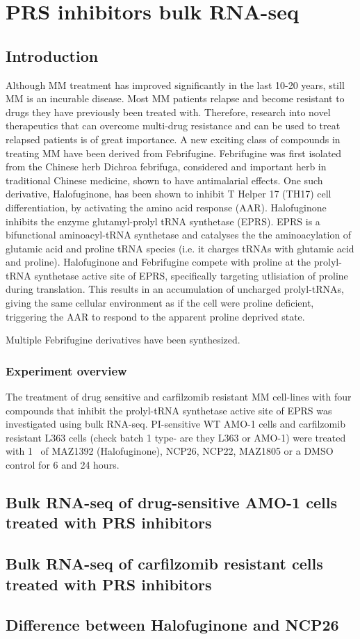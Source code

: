 \chapter{\label{ch:5-bulk}PRS inhibitors bulk RNA-seq}


\section{Introduction}
Although MM treatment has improved significantly in the last 10-20 years, still MM is an incurable disease.
Most MM patients relapse and become resistant to drugs they have previously been treated with.
Therefore, research into novel therapeutics that can overcome multi-drug resistance and can be used to treat relapsed patients is of great importance.
A new exciting class of compounds in treating MM have been derived from Febrifugine.
Febrifugine was first isolated from the Chinese herb Dichroa febrifuga, considered and important herb in traditional Chinese medicine, shown to have antimalarial effects.
One such derivative, Halofuginone, has been shown to inhibit T Helper 17 (TH17) cell differentiation, by activating the amino acid response (AAR)\cite{sundrud2009halofuginone}.
Halofuginone inhibits the enzyme glutamyl-prolyl tRNA synthetase (EPRS).
EPRS is a bifunctional aminoacyl-tRNA synthetase and catalyses the the aminoacylation of glutamic acid and proline tRNA species (i.e. it charges tRNAs with glutamic acid and proline).
Halofuginone and Febrifugine compete with proline at the prolyl-tRNA synthetase active site of EPRS, specifically targeting utlisiation of proline during translation\cite{keller2012halofuginone}.
This results in an accumulation of uncharged prolyl-tRNAs, giving the same cellular environment as if the cell were proline deficient, triggering the AAR to respond to the apparent proline deprived state.

Multiple Febrifugine derivatives have been synthesized.

\subsection{Experiment overview}
The treatment of drug sensitive and carfilzomib resistant MM cell-lines with four compounds that inhibit  the  prolyl-tRNA  synthetase  active  site  of  EPRS  was investigated using bulk RNA-seq.
PI-sensitive WT AMO-1 cells and carfilzomib resistant L363 cells (check batch 1 type- are they L363 or AMO-1) were treated with 1\si{\micro\Molar} of MAZ1392 (Halofuginone), NCP26, NCP22, MAZ1805 or a DMSO control for 6 and 24 hours.


\section{Bulk RNA-seq of drug-sensitive AMO-1 cells treated with PRS inhibitors}




\section{Bulk RNA-seq of carfilzomib resistant cells treated with PRS inhibitors}



\section{Difference between Halofuginone and NCP26}

